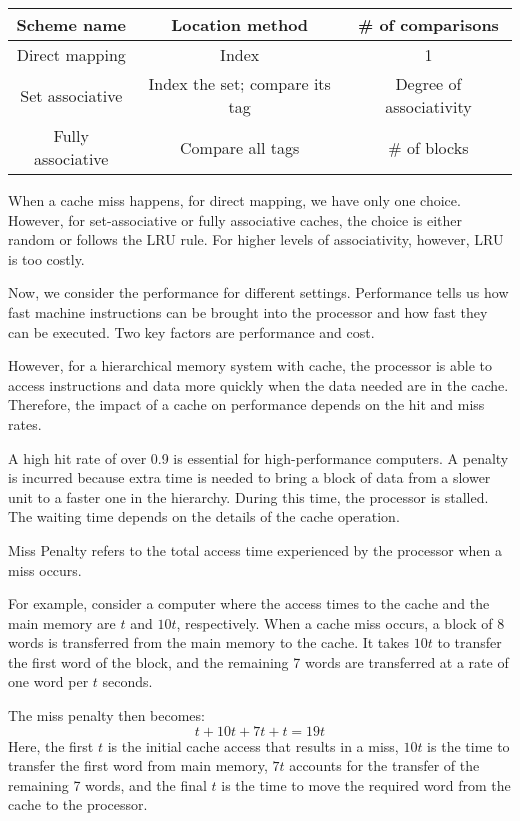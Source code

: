 \begin{table}[H]
  \centering
  \begin{tabular}{c|c|c}
      \toprule
      Scheme name & Location method & \# of comparisons  \\
    \midrule
      Direct mapping & Index & 1  \\
      Set associative & Index the set; compare its tag & Degree of associativity  \\
      Fully associative & Compare all tags & \# of blocks  \\
      \bottomrule
  \end{tabular}
\end{table}

When a cache miss happens, for direct mapping, we have only one choice. However, for set-associative or fully associative caches, the choice is either random or follows the LRU rule. For higher levels of associativity, however, LRU is too costly.

Now, we consider the performance for different settings. Performance tells us how fast machine instructions can be brought into the processor and how fast they can be executed. Two key factors are performance and cost.

However, for a hierarchical memory system with cache, the processor is able to access instructions and data more quickly when the data needed are in the cache. Therefore, the impact of a cache on performance depends on the hit and miss rates.

A high hit rate of over 0.9 is essential for high-performance computers. A penalty is incurred because extra time is needed to bring a block of data from a slower unit to a faster one in the hierarchy. During this time, the processor is stalled. The waiting time depends on the details of the cache operation.

\begin{remark}
  Miss Penalty refers to the total access time experienced by the processor when a miss occurs.
\end{remark}

For example, consider a computer where the access times to the cache and the main memory are \(t\) and \(10t\), respectively. When a cache miss occurs, a block of 8 words is transferred from the main memory to the cache. It takes \(10t\) to transfer the first word of the block, and the remaining 7 words are transferred at a rate of one word per \(t\) seconds.

The miss penalty then becomes:
\[
t + 10t + 7t + t = 19t
\]
Here, the first \(t\) is the initial cache access that results in a miss, \(10t\) is the time to transfer the first word from main memory, \(7t\) accounts for the transfer of the remaining 7 words, and the final \(t\) is the time to move the required word from the cache to the processor.

